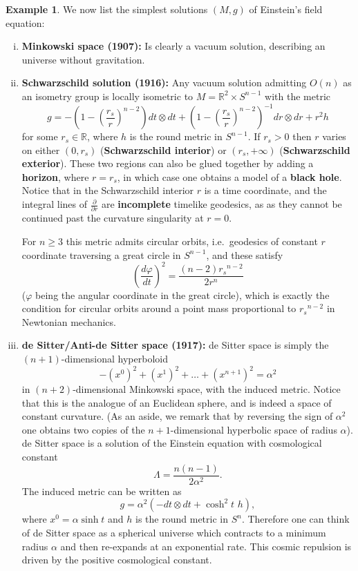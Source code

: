 \documentclass[12pt]{amsart}
\newcommand{\bbR}{\mathbb{R}}      %
\theoremstyle{definition}
\newtheorem{Example}[Thm]{Example}
\theoremstyle{remark}
\begin{document}
\begin{Example} \label{spacetimes}
We now list the simplest solutions $(M,g)$ of Einstein's field equation:
\begin{enumerate}[(i)]
\item
{\bf Minkowski space (1907):} Is clearly a vacuum solution, describing an universe without gravitation.
\item
{\bf Schwarzschild solution (1916):} Any vacuum solution admitting $O(n)$ as an isometry group is locally isometric to $M=\bbR^2 \times S^{n-1}$ with the metric
\[
g = - \left( 1 - \left(\frac{r_s}{r}\right)^{n-2} \right) dt \otimes dt + \left( 1 - \left(\frac{r_s}{r}\right)^{n-2} \right)^{-1} dr \otimes dr + r^2 h
\]
for some $r_s \in \bbR$, where $h$ is the round metric in $S^{n-1}$. If $r_s > 0$ then $r$ varies on either $(0,r_s)$ ({\bf Schwarzschild interior}) or $(r_s,+\infty)$ ({\bf Schwarzschild exterior}). These two regions can also be glued together by adding a {\bf horizon}, where $r=r_s$, in which case one obtains a model of a {\bf black hole}. Notice that in the Schwarzschild interior $r$ is a time coordinate, and the integral lines of $\frac{\partial}{\partial r}$ are {\bf incomplete} timelike geodesics, as as they cannot be continued past the curvature singularity at $r=0$.

For $n \geq 3$ this metric admits circular orbits, i.e.~geodesics of constant $r$ coordinate traversing a great circle in $S^{n-1}$, and these satisfy
\[
\left( \frac{d\varphi}{dt} \right)^2 = \frac{(n-2){r_s}^{n-2}}{2r^n}
\]
($\varphi$ being the angular coordinate in the great circle), which is exactly the condition for circular orbits around a point mass proportional to ${r_s}^{n-2}$ in Newtonian mechanics.
\item
{\bf de Sitter/Anti-de Sitter space (1917):} de Sitter space is simply the $(n+1)$-dimensional hyperboloid
\[
-(x^0)^2 + (x^1)^2 + \ldots + (x^{n+1})^2 = \alpha^2
\]
in $(n+2)$-dimensional Minkowski space, with the induced metric. Notice that this is the analogue of an Euclidean sphere, and is indeed a space of constant curvature. (As an aside, we remark that by reversing the sign of $\alpha^2$ one obtains two copies of the $n+1$-dimensional hyperbolic space of radius $\alpha$). de Sitter space is a solution of the Einstein equation with cosmological constant 
\[
\Lambda=\frac{n(n-1)}{2\alpha^2}.
\]
The induced metric can be written as
\[
g = \alpha^2 \left( - dt \otimes dt + \cosh^2 t \,\, h \right),
\]
where $x^0=\alpha\sinh t$ and $h$ is the round metric in $S^n$. Therefore one can think of de Sitter space as a spherical universe which contracts to a minimum radius $\alpha$ and then re-expands at an exponential rate. This cosmic repulsion is driven by the positive cosmological constant.


\end{enumerate}
\end{Example}
\end{document}
